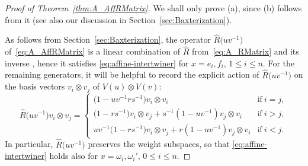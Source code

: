 \documentclass[10pt,a4paper]{amsart}
\numberwithin{equation}{section}
\begin{document}
\begin{proof}[Proof of Theorem~\ref{thm:A_AffRMatrix}]
We shall only prove (a), since (b) follows from it (see also our discussion in Section~\ref{sec:Baxterization}).

As follows from Section~\ref{sec:Baxterization}, the operator $\hat{R}\bigl(uv^{-1}\bigr)$ of~\eqref{eq:A_AffRMatrix} is a linear combination of $\hat{R}$ from~\eqref{eq:A_RMatrix} and its inverse , hence it satisfies \eqref{eq:affine-intertwiner} for $x = e_{i},f_{i}$, $1 \le i \le n$. For the remaining generators, it will be helpful to record the explicit action of $\hat{R}\bigl(uv^{-1}\bigr)$ on the basis vectors $v_{i} \otimes v_{j}$ of $V(u) \otimes V(v)$:
\begin{equation}\label{eq:R-action-A}
 \hat{R}\bigl(uv^{-1}\bigr) v_{i} \otimes v_{j} =
 \begin{cases}
 \bigl(1 - uv^{-1}rs^{-1}\bigr)v_{i} \otimes v_{i} & \text{if}\ i = j, \\
 \bigl(1 - rs^{-1}\bigr)v_{i} \otimes v_{j} + s^{-1}(1 - uv^{-1})v_{j} \otimes v_{i} & \text{if}\ i > j, \\
 uv^{-1}\bigl(1 - rs^{-1}\bigr)v_{i} \otimes v_{j} + r(1 - uv^{-1})v_{j} \otimes v_{i} & \text{if}\ i < j.
 \end{cases}
\end{equation}
In particular, $\hat{R}\bigl(uv^{-1}\bigr)$ preserves the weight subspaces, so that \eqref{eq:affine-intertwiner} holds also for $x = \omega_{i},\omega_{i}'$, $0 \le i \le n$.



\end{proof}
\end{document}

